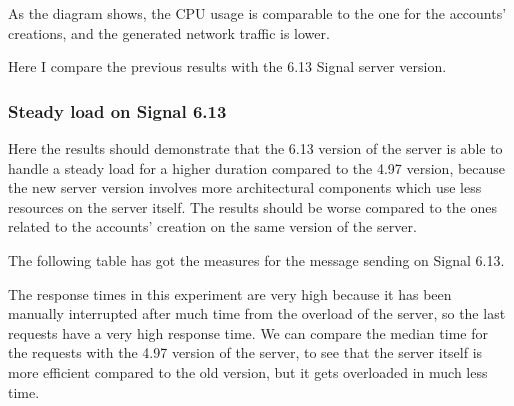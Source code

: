 As the diagram shows, the CPU usage is comparable to the one for the accounts' creations, and the generated network traffic is lower.

Here I compare the previous results with the 6.13 Signal server version.

\subsubsection{Steady load on Signal 6.13}

Here the results should demonstrate that the 6.13 version of the server is able to handle a steady load for a higher duration compared to the 4.97 version, because the new server version involves more architectural components which use less resources on the server itself.
The results should be worse compared to the ones related to the accounts' creation on the same version of the server.

The following table has got the measures for the message sending on Signal 6.13.

\begin{table}[H]
\caption{Steady load message sending on Signal 6.13}
\label{tab:steadyloadmessage613}
\end{table}

The response times in this experiment are very high because it has been manually interrupted after much time from the overload of the server, so the last requests have a very high response time. We can compare the median time for the requests with the 4.97 version of the server, to see that the server itself is more efficient compared to the old version, but it gets overloaded in much less time.

